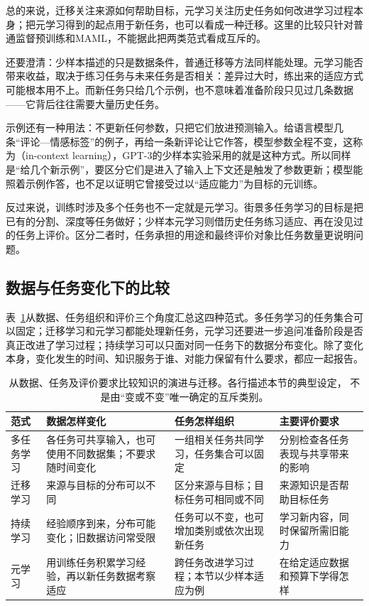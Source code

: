 总的来说，迁移关注来源如何帮助目标，元学习关注历史任务如何改进学习过程本身；把元学习得到的起点用于新任务，也可以看成一种迁移。这里的比较只针对普通监督预训练和MAML，不能据此把两类范式看成互斥的。

还要澄清：少样本描述的只是数据条件，普通迁移等方法同样能处理。元学习能否带来收益，取决于练习任务与未来任务是否相关：差异过大时，练出来的适应方式可能根本用不上。而新任务只给几个示例，也不意味着准备阶段只见过几条数据——它背后往往需要大量历史任务。

示例还有一种用法：不更新任何参数，只把它们放进预测输入。给语言模型几条“评论—情感标签”的例子，再给一条新评论让它作答，模型参数全程不变，这称为（in-context learning），GPT-3的少样本实验采用的就是这种方式。所以同样是“给几个新示例”，要区分它们是进入了输入上下文还是触发了参数更新；模型能照着示例作答，也不足以证明它曾接受过以“适应能力”为目标的元训练。

反过来说，训练时涉及多个任务也不一定就是元学习。街景多任务学习的目标是把已有的分割、深度等任务做好；少样本元学习则借历史任务练习适应、再在没见过的任务上评价。区分二者时，任务承担的用途和最终评价对象比任务数量更说明问题。

\subsection{数据与任务变化下的比较}
\label{sec:knowledge-evolution-comparison}

表~\ref{tab:knowledge-evolution-comparison}从数据、任务组织和评价三个角度汇总这四种范式。多任务学习的任务集合可以固定；迁移学习和元学习都能处理新任务，元学习还要进一步追问准备阶段是否真正改进了学习过程；持续学习可以只面对同一任务下的数据分布变化。除了变化本身，变化发生的时间、知识服务于谁、对能力保留有什么要求，都应一起报告。

\begin{table}[htbp]
  \centering
  \small
  \begin{tabularx}{\linewidth}{@{}lXXX@{}}
    \toprule
    \textbf{范式} & \textbf{数据怎样变化} & \textbf{任务怎样组织} & \textbf{主要评价要求} \\
    \midrule
    多任务学习 & 各任务可共享输入，也可使用不同数据集；不要求随时间变化 & 一组相关任务共同学习，任务集合可以固定 & 分别检查各任务表现与共享带来的影响 \\
    迁移学习 & 来源与目标的分布可以不同 & 区分来源与目标；目标任务可相同或不同 & 来源知识是否帮助目标任务 \\
    持续学习 & 经验顺序到来，分布可能变化；旧数据访问常受限 & 任务可以不变，也可增加类别或依次出现新任务 & 学习新内容，同时保留所需旧能力 \\
    元学习 & 用训练任务积累学习经验，再以新任务数据考察适应 & 跨任务改进学习过程；本节以少样本适应为例 & 在给定适应数据和预算下学得怎样 \\
    \bottomrule
  \end{tabularx}
  \caption{从数据、任务及评价要求比较知识的演进与迁移。各行描述本节的典型设定，
  不是由“变或不变”唯一确定的互斥类别。}
  \label{tab:knowledge-evolution-comparison}
\end{table}

